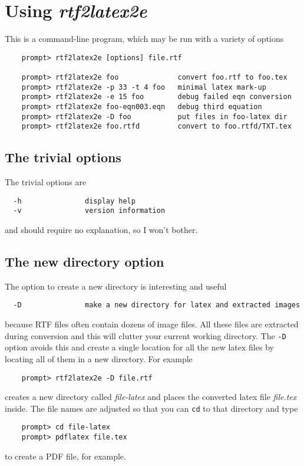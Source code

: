 \documentclass{article}
\def\rtf2latex2e{{\it rtf2latex2e}}
\begin{document}
\section{Using \rtf2latex2e}

This is a command-line program, which may be run with a variety of options
\begin{verbatim}
    prompt> rtf2latex2e [options] file.rtf
    
    prompt> rtf2latex2e foo              convert foo.rtf to foo.tex
    prompt> rtf2latex2e -p 33 -t 4 foo   minimal latex mark-up
    prompt> rtf2latex2e -e 15 foo        debug failed eqn conversion
    prompt> rtf2latex2e foo-eqn003.eqn   debug third equation 
    prompt> rtf2latex2e -D foo           put files in foo-latex dir
    prompt> rtf2latex2e foo.rtfd         convert to foo.rtfd/TXT.tex
\end{verbatim}

\subsection{The trivial options}
The trivial options are
\begin{verbatim}
  -h               display help
  -v               version information
\end{verbatim}
and should require no explanation, so I won't bother.

\subsection{The new directory option}
The option to create a new directory is interesting and useful
\begin{verbatim}
  -D               make a new directory for latex and extracted images
\end{verbatim}
because RTF files often contain dozens of image files.  All these
files are extracted during conversion and this will clutter your
current working directory.  The \texttt{-D} option avoids this and create a single
location for all the new latex files by locating all of them in a new
directory.  For example
\begin{verbatim}
    prompt> rtf2latex2e -D file.rtf
\end{verbatim}
creates a new directory called \textit{file-latex} and places the converted
latex file \textit{file.tex} inside.  The file names are adjusted so that
you can \texttt{cd} to that directory and type 
\begin{verbatim}
    prompt> cd file-latex
    prompt> pdflatex file.tex
\end{verbatim}
to create a PDF file, for example.
\end{document}
